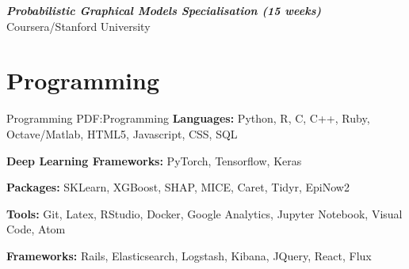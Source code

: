 \documentclass[letterpaper,10pt,oneside]{article}
\begin{document}
\begin{body}
\textbf{\textit{Probabilistic Graphical Models Specialisation (15 weeks)}} Coursera/Stanford University 
\hfill
{}


\section
{Programming}
{Programming}
{PDF:Programming}
\textbf{Languages:} Python, R, C, C++, Ruby, Octave/Matlab, HTML5, Javascript, CSS, SQL

\textbf{Deep Learning Frameworks:}  PyTorch, Tensorflow, Keras

\textbf{Packages:} SKLearn, XGBoost, SHAP, MICE, Caret, Tidyr, EpiNow2

\textbf{Tools:} Git, Latex, RStudio, Docker, Google Analytics, Jupyter Notebook, Visual Code, Atom

\textbf{Frameworks:} Rails, Elasticsearch, Logstash, Kibana, JQuery, React, Flux
\end{body}


\label{LastPage}~
\end{document}

